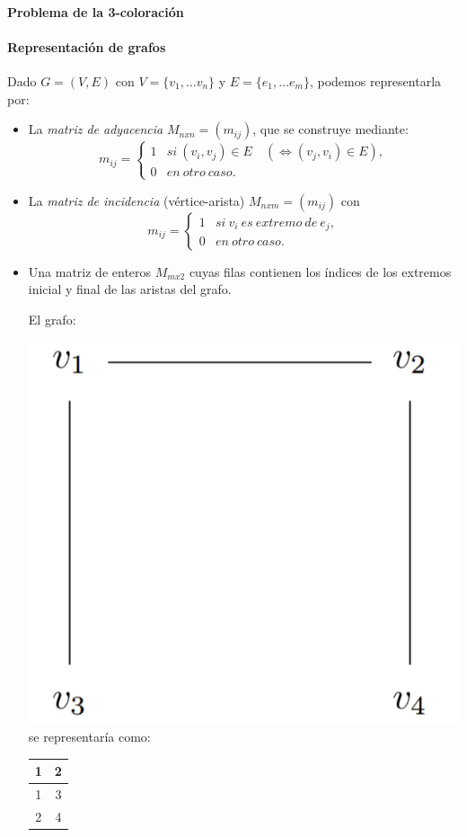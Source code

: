 \hfil




\paragraph{Problema de la 3-coloración}

\hfil






\paragraph{Representación de grafos}

\hfil

Dado $G=(V,E)$ con $V=\{v_1,\dots v_n\}$ y $E=\{e_1,\dots e_m\}$, podemos representarla por:

\begin{itemize}
	\item  La \textit{matriz de adyacencia} $M_{nxn} = (m_{ij})$, que se construye mediante:
	\[
	m_{ij} =
	\begin{cases}
	1 & si\ (v_i,v_j) \in E \quad ( \Leftrightarrow (v_j,v_i)\in E ), \\
	0 & en\ otro\ caso.
	\end{cases}
	\]
	
	\item La \textit{matriz de incidencia} (vértice-arista) $M_{nxm} = (m_{ij})$ con
	\[
	m_{ij} =
	\begin{cases}
	1 & si\ v_i\ es\ extremo\ de\ e_j, \\
	0 & en\ otro\ caso.
	\end{cases}
	\]
	
	\item Una matriz de enteros $M_{mx2}$ cuyas filas contienen los índices de los extremos inicial y final de las aristas del grafo.
	
	\begin{example}
		El grafo:
		
		\includegraphics[width=.2\linewidth]{gfx/exgraph}
		\qquad se representaría como: \qquad
		\begin{tabular}{|c|c|}
			\hline	1 & 2 \\ \hline 1 & 3 \\ \hline 2 & 4 \\ \hline
		\end{tabular}	
		
	\end{example}
	
\end{itemize}
